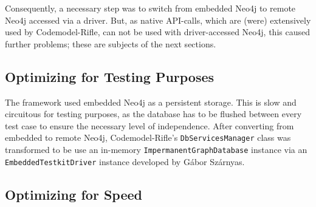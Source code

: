 Consequently, a necessary step was to switch from embedded Neo4j to remote Neo4j accessed via a driver. But, as native API-calls, which are (were) extensively used by Codemodel-Rifle, can not be used with driver-accessed Neo4j, this caused further problems; these are subjects of the next sections.


\subsection{Optimizing for Testing Purposes}

The framework used embedded Neo4j as a persistent storage. This is slow and circuitous for testing purposes, as the database has to be flushed between every test case to ensure the necessary level of independence. After converting from embedded to remote Neo4j, Codemodel-Rifle's \texttt{DbServicesManager} class was transformed to be use an in-memory \texttt{ImpermanentGraphDatabase} instance via an \texttt{EmbeddedTestkitDriver} instance developed by Gábor Szárnyas.~\cite{neo4j-drivers}


\subsection{Optimizing for Speed}